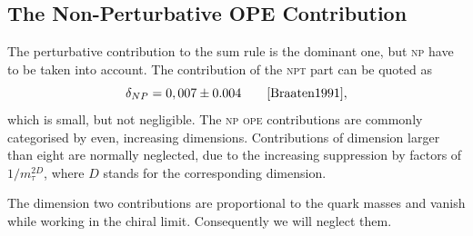 \documentclass[../../index.tex]{subfiles}
\begin{document}
\subsection{The Non-Perturbative OPE Contribution}
The perturbative contribution to the sum rule is the dominant one, but
\textsc{np} have to be taken into account. The contribution of the \textsc{npt}
part can be quoted as
\begin{equation}
  \delta_{NP} = 0,007 \pm 0.004 \qquad \cite{Braaten1991},
\end{equation}
which is small, but not negligible. The \textsc{np} \textsc{ope} contributions
are commonly categorised by even, increasing dimensions. Contributions of
dimension larger than eight are normally neglected, due to the increasing
suppression by factors of \(1/m_\tau^{2D}\), where \(D\) stands for the
corresponding dimension.

The dimension two contributions are proportional to the quark masses and vanish
while working in the chiral limit. Consequently we will neglect them.
\end{document}
